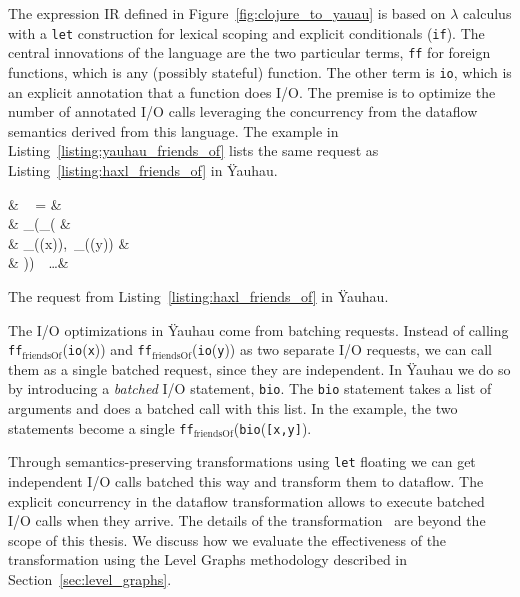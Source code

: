 The expression \ac{IR} defined in Figure~\ref{fig:clojure_to_yauau} is based on $\lambda$ calculus with a \texttt{let} construction for lexical scoping and explicit conditionals (\texttt{if}).
The central innovations of the language are the two particular terms, \texttt{ff} for foreign functions, which is any (possibly stateful) function.
The other term is \texttt{io}, which is an explicit annotation that a function does \ac{I/O}.
The premise is to optimize the number of annotated \ac{I/O} calls leveraging the concurrency from the dataflow semantics derived from this language.
The example in Listing~\ref{listing:yauhau_friends_of} lists the same request as Listing~\ref{listing:haxl_friends_of} in \"{Y}auhau.

\begin{listing}
\begin{flalign*}
& ~ = & \\ 
& \quad {}_(_( & \\ 
& \quad \quad {}_((x)),~_((y)) & \\
& \quad ))~~\ldots & 
\end{flalign*}
\caption{The request from Listing~\ref{listing:haxl_friends_of} in \"{Y}auhau.}
\label{listing:yauhau_friends_of}
\end{listing}

The \ac{I/O} optimizations in \"{Y}auhau come from batching requests.
Instead of calling \texttt{ff}$_\text{friendsOf}$(\texttt{io}(\texttt{x})) and \texttt{ff}$_\text{friendsOf}$(\texttt{io}(\texttt{y})) as two separate \ac{I/O} requests, we can call them as a single batched request, since they are independent.
In \"{Y}auhau we do so by introducing a \emph{batched} \ac{I/O} statement, \texttt{bio}.
The \texttt{bio} statement takes a list of arguments and does a batched call with this list.
In the example, the two statements become a single \texttt{ff}$_\text{friendsOf}$(\texttt{bio}(\texttt{[x,y]}).

Through semantics-preserving transformations using \texttt{let} floating we can get independent \ac{I/O} calls batched this way and transform them to dataflow.
The explicit concurrency in the dataflow transformation allows to execute batched \ac{I/O} calls when they arrive.
The details of the transformation~\cite{ertel_cc18} are beyond the scope of this thesis.
We discuss how we evaluate the effectiveness of the transformation using the Level Graphs methodology described in Section~\ref{sec:level_graphs}.


